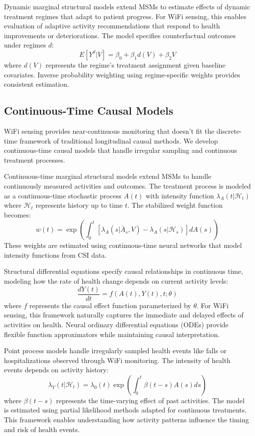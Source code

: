 \documentclass[journal]{IEEEtran}
\begin{document}
Dynamic marginal structural models extend MSMs to estimate effects of dynamic treatment regimes that adapt to patient progress. For WiFi sensing, this enables evaluation of adaptive activity recommendations that respond to health improvements or deteriorations. The model specifies counterfactual outcomes under regimes $d$:
$$E[Y^d | V] = \beta_0 + \beta_1 d(V) + \beta_2 V$$
where $d(V)$ represents the regime's treatment assignment given baseline covariates. Inverse probability weighting using regime-specific weights provides consistent estimation.

\subsection{Continuous-Time Causal Models}

WiFi sensing provides near-continuous monitoring that doesn't fit the discrete-time framework of traditional longitudinal causal methods. We develop continuous-time causal models that handle irregular sampling and continuous treatment processes.

Continuous-time marginal structural models extend MSMs to handle continuously measured activities and outcomes. The treatment process is modeled as a continuous-time stochastic process $A(t)$ with intensity function $\lambda_A(t | \mathcal{H}_t)$ where $\mathcal{H}_t$ represents history up to time $t$. The stabilized weight function becomes:
$$w(t) = \exp\left( \int_0^t \left[ \lambda_A(s | \bar{A}_s, V) - \lambda_A(s | \mathcal{H}_s) \right] dA(s) \right)$$
These weights are estimated using continuous-time neural networks that model intensity functions from CSI data.

Structural differential equations specify causal relationships in continuous time, modeling how the rate of health change depends on current activity levels:
$$\frac{dY(t)}{dt} = f(A(t), Y(t), t; \theta)$$
where $f$ represents the causal effect function parameterized by $\theta$. For WiFi sensing, this framework naturally captures the immediate and delayed effects of activities on health. Neural ordinary differential equations (ODEs) provide flexible function approximators while maintaining causal interpretation.

Point process models handle irregularly sampled health events like falls or hospitalizations observed through WiFi monitoring. The intensity of health events depends on activity history:
$$\lambda_Y(t | \mathcal{H}_t) = \lambda_0(t) \exp\left( \int_0^t \beta(t-s) A(s) ds \right)$$
where $\beta(t-s)$ represents the time-varying effect of past activities. The model is estimated using partial likelihood methods adapted for continuous treatments. This framework enables understanding how activity patterns influence the timing and risk of health events.
\end{document}

